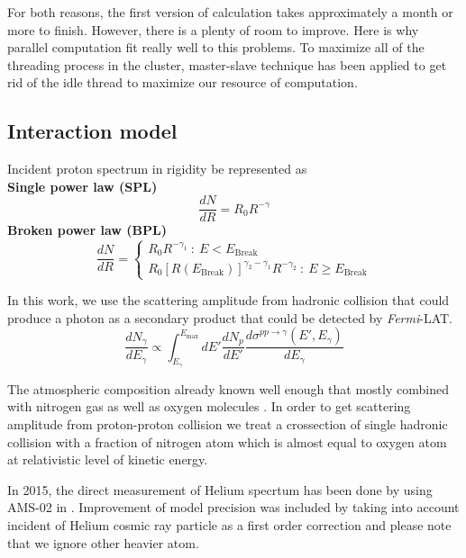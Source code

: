 For both reasons, the first version of calculation takes approximately a month or more to finish.
However, there is a plenty of room to improve. Here is why parallel computation fit really well to this problems.
To maximize all of the threading process in the cluster, master-slave technique has been applied to get rid of the idle thread to maximize our resource of computation.


\subsection{Interaction model}
Incident proton spectrum in rigidity be represented as \\
\textbf{Single power law (SPL)}
\begin{equation}
    \frac{dN}{dR} = R_0R^{-\gamma}
    \label{eq:spl}
\end{equation}
\textbf{Broken power law (BPL)}
\begin{equation}
\frac{dN}{dR}=
  \begin{cases}
    R_0R^{-\gamma_1}\ :\ E < E_{\text{Break}}\\
    R_0[R(E_{\text{Break}})]^{\gamma_2-\gamma_1}R^{-\gamma_2}\ :\ E \ge E_{\text{Break}}
  \end{cases}
  \label{eq:bpl}
\end{equation}

In this work, we use the scattering amplitude from hadronic collision \cite{K&Omodel} that could produce a photon as a secondary product that could be detected by \textit{Fermi}-LAT.
\begin{equation}
    \frac{dN_\gamma}{dE_\gamma} \propto \int^{E_{\text{max}}}_{E_\gamma} dE'\frac{dN_p}{dE'} \frac{d\sigma^{pp\rightarrow\gamma}(E',E_\gamma)}{dE_\gamma}
\end{equation}
\par The atmospheric composition already known well enough that mostly combined with nitrogen gas as well as oxygen molecules \cite{atmosCompos}. 
In order to get scattering amplitude from proton-proton collision we treat a crossection of single hadronic collision with a fraction of nitrogen atom which is almost equal to oxygen atom \cite{WAtwater} at relativistic level of kinetic energy.
\par In 2015, the direct measurement of Helium specrtum has been done by using AMS-02 in \cite{AMS-02Helium}. Improvement of model precision was included by taking into account incident of Helium cosmic ray particle as a first order correction and please note that we ignore other heavier atom.

